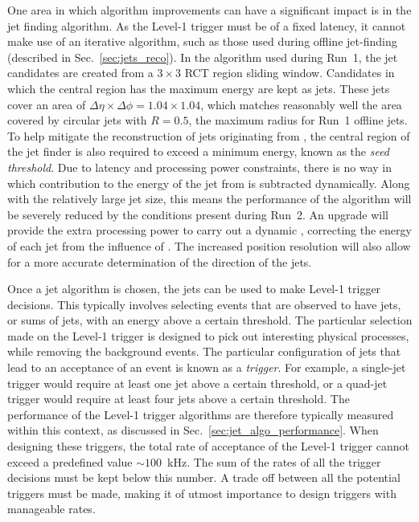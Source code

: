 One area in which algorithm improvements can have a significant impact
is in the jet finding algorithm. As the Level-1 trigger must be of a
fixed latency, it cannot make use of an iterative algorithm, such as
those used during offline jet-finding (described in
Sec.~\ref{sec:jets_reco}). In the algorithm used during Run~1, the jet
candidates are created from a $3\times3$ RCT region sliding window.
Candidates in which the central region has the maximum energy are kept
as jets.  These jets cover an area of $\Delta\eta\times\Delta\phi =
1.04 \times 1.04$, which matches reasonably well the area covered by
circular jets with $R=0.5$, the maximum radius for Run~1 offline jets.
To help mitigate the reconstruction of jets originating from \PU, the
central region of the jet finder is also required to exceed a minimum
energy, known as the \emph{seed threshold}. Due to latency and
processing power constraints, there is no way in which contribution to
the energy of the jet from \PU is subtracted dynamically. Along with
the relatively large jet size, this means the performance of the
algorithm will be severely reduced by the conditions present during
Run~2. An upgrade will provide the extra processing power to carry out
a dynamic \PUS, correcting the energy of each jet from the influence
of \PU. The increased position resolution will also allow for a more
accurate determination of the direction of the jets.

Once a jet algorithm is chosen, the jets can be used to make Level-1
trigger decisions. This typically involves selecting events that are
observed to have jets, or sums of jets, with an energy above a certain
threshold. The particular selection made on the Level-1 trigger is
designed to pick out interesting physical processes, while removing
the background events. The particular configuration of jets that lead
to an acceptance of an event is known as a \emph{trigger}. For
example, a single-jet trigger would require at least one jet above a
certain \pT threshold, or a quad-jet trigger would require at least
four jets above a certain threshold. The performance of the Level-1
trigger algorithms are therefore typically measured within this
context, as discussed in Sec.~\ref{sec:jet_algo_performance}.  When
designing these triggers, the total rate of acceptance of the Level-1
trigger cannot exceed a predefined value $\sim 100$~kHz. The sum of
the rates of all the trigger decisions must be kept below this number.
A trade off between all the potential triggers must be made, making it
of utmost importance to design triggers with manageable rates.

